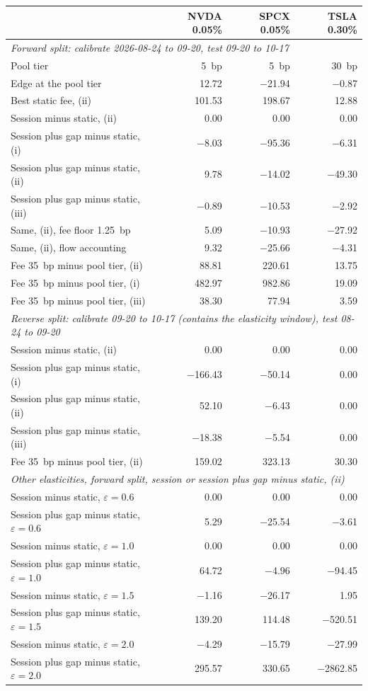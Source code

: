 \begin{tabular}{lrrr}
\toprule
 & NVDA 0.05\% & SPCX 0.05\% & TSLA 0.30\% \\
\midrule
\multicolumn{4}{l}{\emph{Forward split: calibrate 2026-08-24 to 09-20, test 09-20 to 10-17}} \\
Pool tier & 5~bp & 5~bp & 30~bp \\
Edge at the pool tier & 12.72 & $-$21.94 & $-$0.87 \\
Best static fee, (ii) & 101.53 & 198.67 & 12.88 \\
Session minus static, (ii) & 0.00 & 0.00 & 0.00 \\
Session plus gap minus static, (i) & $-$8.03 & $-$95.36 & $-$6.31 \\
Session plus gap minus static, (ii) & 9.78 & $-$14.02 & $-$49.30 \\
Session plus gap minus static, (iii) & $-$0.89 & $-$10.53 & $-$2.92 \\
Same, (ii), fee floor 1.25~bp & 5.09 & $-$10.93 & $-$27.92 \\
Same, (ii), flow accounting & 9.32 & $-$25.66 & $-$4.31 \\
Fee 35~bp minus pool tier, (ii) & 88.81 & 220.61 & 13.75 \\
Fee 35~bp minus pool tier, (i) & 482.97 & 982.86 & 19.09 \\
Fee 35~bp minus pool tier, (iii) & 38.30 & 77.94 & 3.59 \\
\midrule
\multicolumn{4}{l}{\emph{Reverse split: calibrate 09-20 to 10-17 (contains the elasticity window), test 08-24 to 09-20}} \\
Session minus static, (ii) & 0.00 & 0.00 & 0.00 \\
Session plus gap minus static, (i) & $-$166.43 & $-$50.14 & 0.00 \\
Session plus gap minus static, (ii) & 52.10 & $-$6.43 & 0.00 \\
Session plus gap minus static, (iii) & $-$18.38 & $-$5.54 & 0.00 \\
Fee 35~bp minus pool tier, (ii) & 159.02 & 323.13 & 30.30 \\
\midrule
\multicolumn{4}{l}{\emph{Other elasticities, forward split, session or session plus gap minus static, (ii)}} \\
Session minus static, $\varepsilon = 0.6$ & 0.00 & 0.00 & 0.00 \\
Session plus gap minus static, $\varepsilon = 0.6$ & 5.29 & $-$25.54 & $-$3.61 \\
Session minus static, $\varepsilon = 1.0$ & 0.00 & 0.00 & 0.00 \\
Session plus gap minus static, $\varepsilon = 1.0$ & 64.72 & $-$4.96 & $-$94.45 \\
Session minus static, $\varepsilon = 1.5$ & $-$1.16 & $-$26.17 & 1.95 \\
Session plus gap minus static, $\varepsilon = 1.5$ & 139.20 & 114.48 & $-$520.51 \\
Session minus static, $\varepsilon = 2.0$ & $-$4.29 & $-$15.79 & $-$27.99 \\
Session plus gap minus static, $\varepsilon = 2.0$ & 295.57 & 330.65 & $-$2862.85 \\
\bottomrule
\end{tabular}
